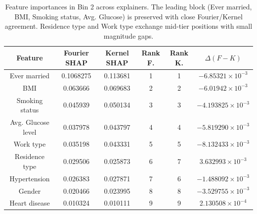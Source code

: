 \documentclass[letterpaper,11pt]{article}
\numberwithin{equation}{section}
\numberwithin{equation}{section}
\begin{document}
\begin{table}[H]
    \centering
    \begin{tabular}{|c||c|c|c|c|c|} \hline 
         Feature & Fourier SHAP & Kernel SHAP & Rank F. & Rank K. & $\Delta (F-K) $ \\ \hline \hline 
         Ever married & 0.1068275 & 0.113681 & 1 & 1 & $-6.85321 \times 10^{-3}$ \\ \hline 
         BMI & 0.063666 & 0.069683 & 2 & 2 & $-6.01942 \times 10^{-3}$ \\ \hline 
         Smoking status & 0.045939 & 0.050134 & 3 & 3 & $-4.193825\times 10^{-3}$ \\ \hline 
         Avg. Glucose level & 0.037978 &	0.043797 & 4 & 4 & $-5.819290\times 10^{-3}$ \\ \hline 
        Work type & 0.035198 & 0.043331 & 5 & 5 & $-8.132433\times 10^{-3}$ \\ \hline 
        Residence type & 0.029506 &	0.025873 & 6 & 7 & $3.632993\times 10^{-3}$\\ \hline 
        Hypertension & 0.026383 & 0.027871 & 7 & 6 & $-1.488092\times 10^{-3}$ \\ \hline 
        Gender & 0.020466 & 0.023995 & 8 & 8 & $-3.529755\times 10^{-3}$ \\ \hline
        Heart disease &	0.010324 & 0.010111 & 9 & 9	& $2.130508\times 10^{-4}$ \\ \hline 
    \end{tabular}
    \caption{Feature importances in Bin 2 across explainers. The leading block (Ever married, BMI, Smoking status, Avg. Glucose) is preserved with close Fourier/Kernel agreement. Residence type and Work type exchange mid-tier positions with small magnitude gaps.}
\end{table}
\end{document}

